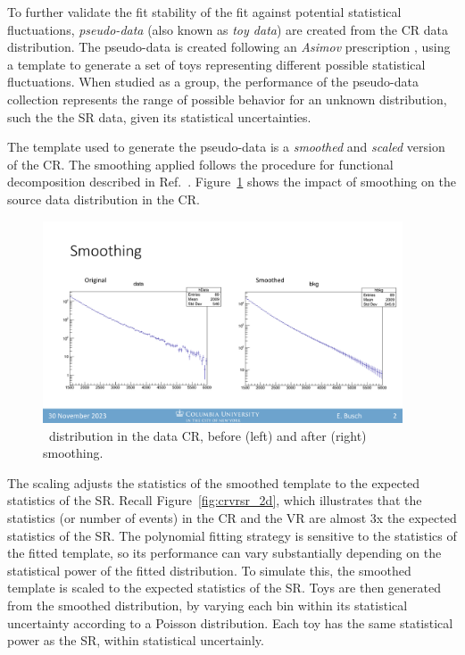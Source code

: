 To further validate the fit stability of the fit against potential statistical fluctuations, \textit{pseudo-data} (also known as \textit{toy data}) are created from the CR data distribution. 
The pseudo-data is created following an \textit{Asimov} prescription \cite{asimov}, using a template to generate a set of toys representing different possible statistical fluctuations.
When studied as a group, the performance of the pseudo-data collection represents the range of possible behavior for an unknown distribution, such the the SR data, given its statistical uncertainties.

The template used to generate the pseudo-data is a \textit{smoothed} and \textit{scaled} version of the CR. 
The smoothing applied follows the procedure for functional decomposition described in Ref.~\cite{edgar2018functional}.
Figure~\ref{fig:smoothing} shows the impact of smoothing on the source data distribution in the CR.
\begin{figure}[!htbp]
\centering
   \includegraphics[width=0.95\textwidth]{figures/stats/smoothing}
    \caption{\mt~distribution in the data CR, before (left) and after (right) smoothing.
    \label{fig:smoothing}}
\end{figure}

The scaling adjusts the statistics of the smoothed template to the expected statistics of the SR.
Recall Figure~\ref{fig:crvrsr_2d}, which illustrates that the statistics (or number of events) in the CR and the VR are almost 3x the expected statistics of the SR.
The polynomial fitting strategy is sensitive to the statistics of the fitted template, so its performance can vary substantially depending on the statistical power of the fitted distribution.
To simulate this, the smoothed template is scaled to the expected statistics of the SR.
Toys are then generated from the smoothed distribution, by varying each bin within its statistical uncertainty according to a Poisson distribution. 
Each toy has the same statistical power as the SR, within statistical uncertainly.

